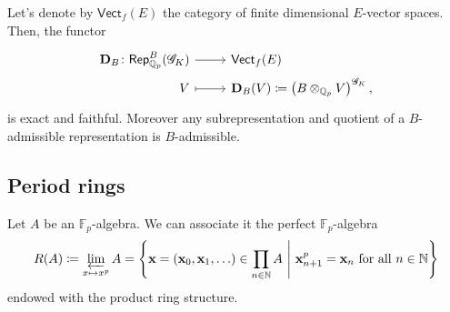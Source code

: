 \begin{prop}
	Let's denote by $\mathsf{Vect}_f(E)$ the category of finite dimensional $E$-vector spaces.
	Then, the functor
	\begin{equation*}
	\begin{tikzcd}[row sep = 0ex
		,/tikz/column 1/.append style={anchor=base east}
		,/tikz/column 2/.append style={anchor=base west}]
		\mathbf{D}_B\colon \mathsf{Rep}_{\mathbb{Q}_p}^B(\mathscr{G}_K) \arrow[r, "", rightarrow] &
		\mathsf{Vect}_f(E) \\
		V \arrow[r, "", mapsto] & 
		\mathbf{D}_B(V) \coloneqq \left( B \otimes_{\mathbb{Q}_p} V \right)^{\mathscr{G}_K}
	,\end{tikzcd}
	\end{equation*} 
	is exact and faithful.
	Moreover any subrepresentation and quotient of a $B$-admissible
	representation is $B$-admissible.
\end{prop}



\subsection{Period rings}
\begin{defn}[]
	Let $A$ be an $\mathbb{F}_p$-algebra.
	We can associate it the perfect $\mathbb{F}_p$-algebra
	\begin{equation*}
		R(A) \coloneqq \varprojlim_{x \mapsto x^p} A =
		\left\{ \mathbf{x} = \left( \mathbf{x}_0, \mathbf{x}_1, \ldots \right) 
			\in \prod_{n \in \mathbb{N}} A
		\ \middle|\ \mathbf{x}_{n+1}^p = \mathbf{x}_n \text{ for all } n \in \mathbb{N} \right\}
	\end{equation*}
	endowed with the product ring structure.
\end{defn}



